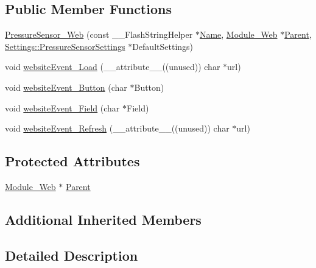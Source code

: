 \subsection*{Public Member Functions}
\begin{DoxyCompactItemize}
\item 
\hyperlink{class_pressure_sensor___web_a5e59489e44f997ccf238b24af8b4e0fa}{Pressure\+Sensor\+\_\+\+Web} (const \+\_\+\+\_\+\+Flash\+String\+Helper $\ast$\hyperlink{class_common_aeea91a726dbe988e515057b32ba0726f}{Name}, \hyperlink{class_module___web}{Module\+\_\+\+Web} $\ast$\hyperlink{class_pressure_sensor___web_a872ae7f086766008667ee54572909836}{Parent}, \hyperlink{struct_settings_1_1_pressure_sensor_settings}{Settings\+::\+Pressure\+Sensor\+Settings} $\ast$Default\+Settings)
\item 
void \hyperlink{class_pressure_sensor___web_a235a466d2a93e7f53609c3113871c145}{website\+Event\+\_\+\+Load} (\+\_\+\+\_\+attribute\+\_\+\+\_\+((unused)) char $\ast$url)
\item 
void \hyperlink{class_pressure_sensor___web_ad4f31802ab30bf6f21157a8504fcb023}{website\+Event\+\_\+\+Button} (char $\ast$Button)
\item 
void \hyperlink{class_pressure_sensor___web_a0529277efb48cb5def4d6271d45a508f}{website\+Event\+\_\+\+Field} (char $\ast$Field)
\item 
void \hyperlink{class_pressure_sensor___web_adbab0e64b14442162327c42b358779a8}{website\+Event\+\_\+\+Refresh} (\+\_\+\+\_\+attribute\+\_\+\+\_\+((unused)) char $\ast$url)
\end{DoxyCompactItemize}
\subsection*{Protected Attributes}
\begin{DoxyCompactItemize}
\item 
\hyperlink{class_module___web}{Module\+\_\+\+Web} $\ast$ \hyperlink{class_pressure_sensor___web_a872ae7f086766008667ee54572909836}{Parent}
\end{DoxyCompactItemize}
\subsection*{Additional Inherited Members}


\subsection{Detailed Description}



